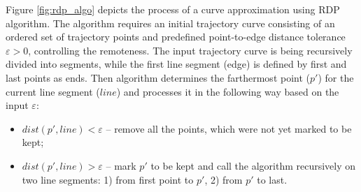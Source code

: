 Figure \ref{fig:rdp_algo} depicts the process of a curve approximation using RDP algorithm. The algorithm requires an initial trajectory curve consisting of an ordered set of trajectory points and predefined point-to-edge distance tolerance $\varepsilon > 0$, controlling the remoteness. The input trajectory curve is being recursively divided into segments, while the first line segment (edge) is defined by first and last points as ends. Then algorithm determines the farthermost point ($p'$) for the current line segment ($line$) and processes it in the following way based on the input $\varepsilon$:

\begin{itemize}
	\setlength\itemsep{0em}
	\item $dist(p', line) < \varepsilon$ -- remove all the points, which were not yet marked to be kept;
	\item $dist(p', line) > \varepsilon$ -- mark $p'$ to be kept and call the algorithm recursively on two line segments: 1) from first point to $p'$, 2) from $p'$ to last.
\end{itemize} 

